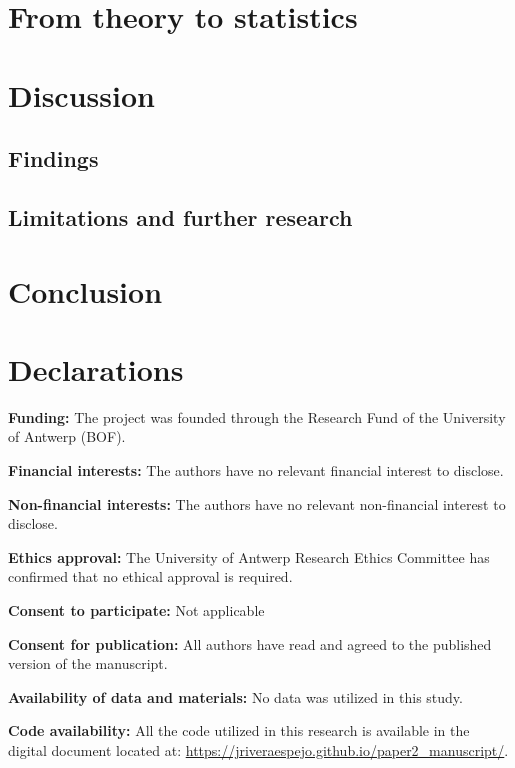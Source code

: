 \documentclass[
  authoryear,
  review,
  1p]{elsarticle}
\begin{document}
\section{From theory to statistics}\label{sec-statistical}

\section{Discussion}\label{sec-discussion}

\subsection{Findings}\label{sec-discussion-finding}

\subsection{Limitations and further
research}\label{sec-discussion-limitations}

\section{Conclusion}\label{sec-conclusion}

\newpage{}

\section*{Declarations}\label{declarations}

\textbf{Funding:} The project was founded through the Research Fund of
the University of Antwerp (BOF).

\textbf{Financial interests:} The authors have no relevant financial
interest to disclose.

\textbf{Non-financial interests:} The authors have no relevant
non-financial interest to disclose.

\textbf{Ethics approval:} The University of Antwerp Research Ethics
Committee has confirmed that no ethical approval is required.

\textbf{Consent to participate:} Not applicable

\textbf{Consent for publication:} All authors have read and agreed to
the published version of the manuscript.

\textbf{Availability of data and materials:} No data was utilized in
this study.

\textbf{Code availability:} All the code utilized in this research is
available in the digital document located at:
\url{https://jriveraespejo.github.io/paper2_manuscript/}.
\end{document}
